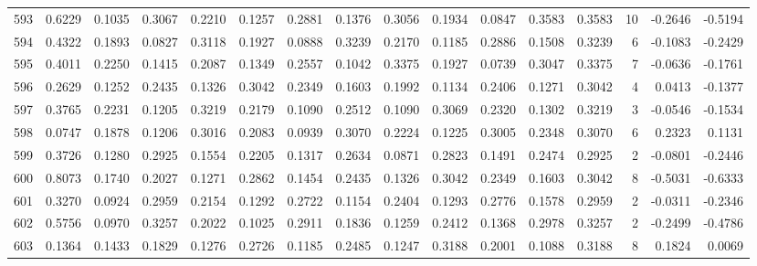 \begin{tabular}{lrrrrrrrrrrrrrrr}
593 &      0.6229 &  0.1035 &  0.3067 &  0.2210 &  0.1257 &  0.2881 &  0.1376 &  0.3056 &  0.1934 &  0.0847 &   0.3583 &     0.3583 &     10 &                   -0.2646 &                    -0.5194 \\
594 &      0.4322 &  0.1893 &  0.0827 &  0.3118 &  0.1927 &  0.0888 &  0.3239 &  0.2170 &  0.1185 &  0.2886 &   0.1508 &     0.3239 &      6 &                   -0.1083 &                    -0.2429 \\
595 &      0.4011 &  0.2250 &  0.1415 &  0.2087 &  0.1349 &  0.2557 &  0.1042 &  0.3375 &  0.1927 &  0.0739 &   0.3047 &     0.3375 &      7 &                   -0.0636 &                    -0.1761 \\
596 &      0.2629 &  0.1252 &  0.2435 &  0.1326 &  0.3042 &  0.2349 &  0.1603 &  0.1992 &  0.1134 &  0.2406 &   0.1271 &     0.3042 &      4 &                    0.0413 &                    -0.1377 \\
597 &      0.3765 &  0.2231 &  0.1205 &  0.3219 &  0.2179 &  0.1090 &  0.2512 &  0.1090 &  0.3069 &  0.2320 &   0.1302 &     0.3219 &      3 &                   -0.0546 &                    -0.1534 \\
598 &      0.0747 &  0.1878 &  0.1206 &  0.3016 &  0.2083 &  0.0939 &  0.3070 &  0.2224 &  0.1225 &  0.3005 &   0.2348 &     0.3070 &      6 &                    0.2323 &                     0.1131 \\
599 &      0.3726 &  0.1280 &  0.2925 &  0.1554 &  0.2205 &  0.1317 &  0.2634 &  0.0871 &  0.2823 &  0.1491 &   0.2474 &     0.2925 &      2 &                   -0.0801 &                    -0.2446 \\
600 &      0.8073 &  0.1740 &  0.2027 &  0.1271 &  0.2862 &  0.1454 &  0.2435 &  0.1326 &  0.3042 &  0.2349 &   0.1603 &     0.3042 &      8 &                   -0.5031 &                    -0.6333 \\
601 &      0.3270 &  0.0924 &  0.2959 &  0.2154 &  0.1292 &  0.2722 &  0.1154 &  0.2404 &  0.1293 &  0.2776 &   0.1578 &     0.2959 &      2 &                   -0.0311 &                    -0.2346 \\
602 &      0.5756 &  0.0970 &  0.3257 &  0.2022 &  0.1025 &  0.2911 &  0.1836 &  0.1259 &  0.2412 &  0.1368 &   0.2978 &     0.3257 &      2 &                   -0.2499 &                    -0.4786 \\
603 &      0.1364 &  0.1433 &  0.1829 &  0.1276 &  0.2726 &  0.1185 &  0.2485 &  0.1247 &  0.3188 &  0.2001 &   0.1088 &     0.3188 &      8 &                    0.1824 &                     0.0069 \\

\end{tabular}
